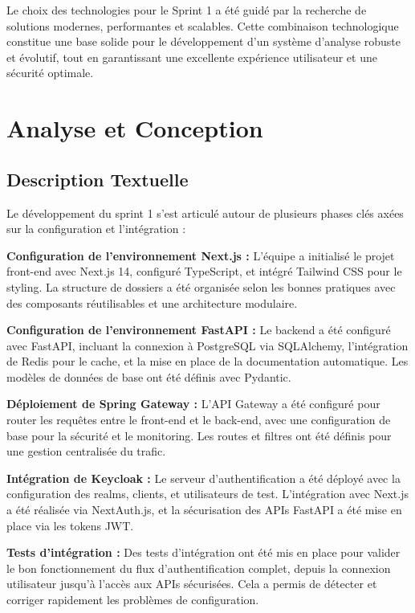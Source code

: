 Le choix des technologies pour le Sprint 1 a été guidé par la recherche de solutions modernes, performantes et scalables. Cette combinaison technologique constitue une base solide pour le développement d'un système d'analyse robuste et évolutif, tout en garantissant une excellente expérience utilisateur et une sécurité optimale.

\section{Analyse et Conception}

\subsection{Description Textuelle}

Le développement du sprint 1 s'est articulé autour de plusieurs phases clés axées sur la configuration et l'intégration :

\textbf{Configuration de l'environnement Next.js :} L'équipe a initialisé le projet front-end avec Next.js 14, configuré TypeScript, et intégré Tailwind CSS pour le styling. La structure de dossiers a été organisée selon les bonnes pratiques avec des composants réutilisables et une architecture modulaire.

\textbf{Configuration de l'environnement FastAPI :} Le backend a été configuré avec FastAPI, incluant la connexion à PostgreSQL via SQLAlchemy, l'intégration de Redis pour le cache, et la mise en place de la documentation automatique. Les modèles de données de base ont été définis avec Pydantic.

\textbf{Déploiement de Spring Gateway :} L'API Gateway a été configuré pour router les requêtes entre le front-end et le back-end, avec une configuration de base pour la sécurité et le monitoring. Les routes et filtres ont été définis pour une gestion centralisée du trafic.

\textbf{Intégration de Keycloak :} Le serveur d'authentification a été déployé avec la configuration des realms, clients, et utilisateurs de test. L'intégration avec Next.js a été réalisée via NextAuth.js, et la sécurisation des APIs FastAPI a été mise en place via les tokens JWT.

\textbf{Tests d'intégration :} Des tests d'intégration ont été mis en place pour valider le bon fonctionnement du flux d'authentification complet, depuis la connexion utilisateur jusqu'à l'accès aux APIs sécurisées. Cela a permis de détecter et corriger rapidement les problèmes de configuration.


